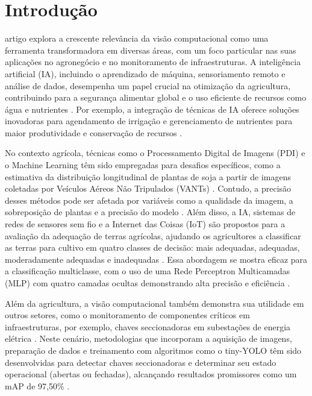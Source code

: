 \documentclass[journal,transmag]{IEEEtran}
\begin{document}
\section{Introdução}
 artigo explora a crescente relevância da visão computacional como uma ferramenta transformadora em diversas áreas, com um foco particular nas suas aplicações no agronegócio e no monitoramento de infraestruturas. A inteligência artificial (IA), incluindo o aprendizado de máquina, sensoriamento remoto e análise de dados, desempenha um papel crucial na otimização da agricultura, contribuindo para a segurança alimentar global e o uso eficiente de recursos como água e nutrientes \cite{Kumar2023}. Por exemplo, a integração de técnicas de IA oferece soluções inovadoras para agendamento de irrigação e gerenciamento de nutrientes para maior produtividade e conservação de recursos \cite{Kumar2023}.

No contexto agrícola, técnicas como o Processamento Digital de Imagens (PDI) e o Machine Learning têm sido empregadas para desafios específicos, como a estimativa da distribuição longitudinal de plantas de soja a partir de imagens coletadas por Veículos Aéreos Não Tripulados (VANTs) \cite{Souza2022}. Contudo, a precisão desses métodos pode ser afetada por variáveis como a qualidade da imagem, a sobreposição de plantas e a precisão do modelo \cite{Souza2022}. Além disso, a IA, sistemas de redes de sensores sem fio e a Internet das Coisas (IoT) são propostos para a avaliação da adequação de terras agrícolas, ajudando os agricultores a classificar as terras para cultivo em quatro classes de decisão: mais adequadas, adequadas, moderadamente adequadas e inadequadas \cite{Vincent2019}. Essa abordagem se mostra eficaz para a classificação multiclasse, com o uso de uma Rede Perceptron Multicamadas (MLP) com quatro camadas ocultas demonstrando alta precisão e eficiência \cite{Vincent2019}.

Além da agricultura, a visão computacional também demonstra sua utilidade em outros setores, como o monitoramento de componentes críticos em infraestruturas, por exemplo, chaves seccionadoras em subestações de energia elétrica \cite{TamiresMRezende2022}. Neste cenário, metodologias que incorporam a aquisição de imagens, preparação de dados e treinamento com algoritmos como o tiny-YOLO têm sido desenvolvidas para detectar chaves seccionadoras e determinar seu estado operacional (abertas ou fechadas), alcançando resultados promissores como um mAP de 97,50\% \cite{TamiresMRezende2022}.
\end{document}
